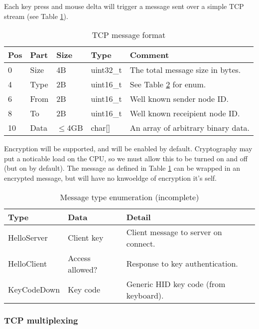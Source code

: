 Each key press and mouse delta will trigger a message sent over a simple TCP 
stream (see Table \ref{tab:messageFormat}).

\begin{table}
  \begin{tabular}{|l|l|l|l|l|}
    \hline
    \textbf{Pos} &
    \textbf{Part} &
    \textbf{Size} &
    \textbf{Type} &
    \textbf{Comment} \\
    \hline
    0 & Size & 4B & uint32\_t & The total message size in bytes. \\
    4 & Type & 2B & uint16\_t & See Table \ref{tab:messageTypes} for enum. \\
    6 & From & 2B & uint16\_t & Well known sender node ID. \\
    8 & To & 2B & uint16\_t & Well known receipient node ID. \\
    10 & Data & $\leq$4GB & char[] & An array of arbitrary binary data. \\
    \hline
  \end{tabular}
  \caption{TCP message format}
  \label{tab:messageFormat}
\end{table}

Encryption will be supported, and will be enabled by default. Cryptography may 
put a noticable load on the CPU, so we must allow this to be turned on and off
(but on by default). The message as defined in Table \ref{tab:messageFormat}
can be wrapped in an encrypted message, but will have no knwoeldge of encryption
it's self.

\begin{table}
  \begin{tabular}{|l|l|l|}
    \hline
    \textbf{Type} &
    \textbf{Data} &
    \textbf{Detail} \\
    \hline
    HelloServer & Client key & Client message to server on connect. \\
    HelloClient & Access allowed? & Response to key authentication. \\
    KeyCodeDown & Key code & Generic HID key code (from keyboard). \\
    \hline
  \end{tabular}
  \caption{Message type enumeration (incomplete)}
  \label{tab:messageTypes}
\end{table}

\subsubsection{TCP multiplexing}

